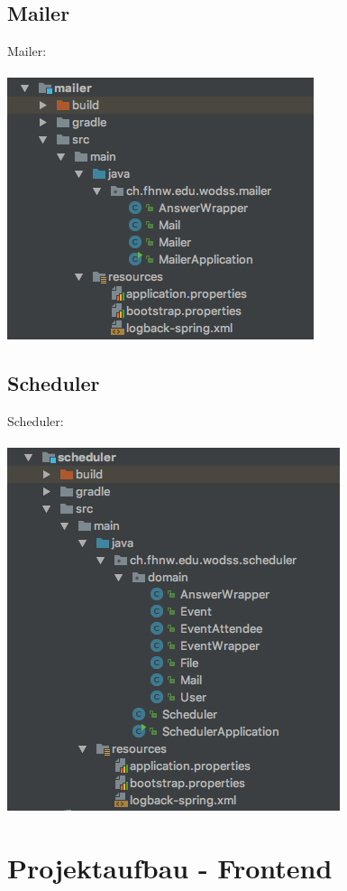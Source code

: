 \documentclass[11pt]{article} %
\begin{document}
\subsection{Mailer}
Mailer:
\\
\\
\includegraphics[scale=0.7]{structure_mailer}
\\
\subsection{Scheduler}
Scheduler:
\\
\\
\includegraphics[scale=0.7]{structure_scheduler}
\\

\newpage
\section{Projektaufbau - Frontend}
\end{document}

